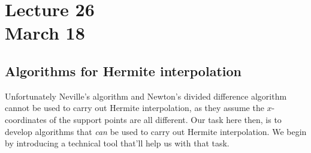 \chapter*{Lecture 26 \\ March 18}
\setcounter{chapter}{26}
\setcounter{section}{0}
\setcounter{equation}{0}

\section{Algorithms for Hermite interpolation}
Unfortunately Neville's algorithm and Newton's divided difference algorithm cannot be used to carry out Hermite interpolation, as they assume the $x$-coordinates of the support points are all different. Our task here then, is to develop algorithms that \textit{can} be used to carry out Hermite interpolation. We begin by introducing a technical tool that'll help us with that task.

